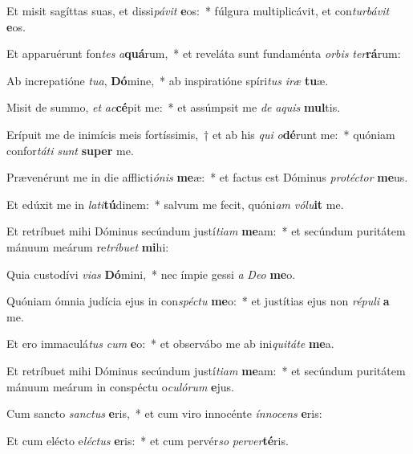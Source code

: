 \item Et misit sagíttas suas, et dissi\textit{pá}\textit{vit} \textbf{e}os:~* fúlgura multiplicávit, et con\textit{tur}\textit{bá}\textit{vit} \textbf{e}os.
\item Et apparuérunt fon\textit{tes} \textit{a}\textbf{quá}rum,~* et reveláta sunt fundaménta \textit{or}\textit{bis} \textit{ter}\textbf{rá}rum:
\item Ab increpatióne \textit{tu}\textit{a}, \textbf{Dó}mine,~* ab inspiratióne spíri\textit{tus} \textit{i}\textit{ræ} \textbf{tu}æ.
\item Misit de summo, \textit{et} \textit{ac}\textbf{cé}pit me:~* et assúmpsit me \textit{de} \textit{a}\textit{quis} \textbf{mul}tis.
\item Erípuit me de inimícis meis fortíssimis,~† et ab his \textit{qui} \textit{o}\textbf{dé}runt me:~* quóniam confor\textit{tá}\textit{ti} \textit{sunt} \textbf{su}\textbf{per} me.
\item Prævenérunt me in die afflicti\textit{ó}\textit{nis} \textbf{me}æ:~* et factus est Dóminus \textit{pro}\textit{téc}\textit{tor} \textbf{me}us.
\item Et edúxit me in \textit{la}\textit{ti}\textbf{tú}dinem:~* salvum me fecit, quóni\textit{am} \textit{vó}\textit{lu}\textbf{it} me.
\item Et retríbuet mihi Dóminus secúndum justí\textit{ti}\textit{am} \textbf{me}am:~* et secúndum puritátem mánuum meárum re\textit{trí}\textit{bu}\textit{et} \textbf{mi}hi:
\item Quia custodívi \textit{vi}\textit{as} \textbf{Dó}mini,~* nec ímpie gessi \textit{a} \textit{De}\textit{o} \textbf{me}o.
\item Quóniam ómnia judícia ejus in con\textit{spéc}\textit{tu} \textbf{me}o:~* et justítias ejus non \textit{ré}\textit{pu}\textit{li} \textbf{a} me.
\item Et ero immaculá\textit{tus} \textit{cum} \textbf{e}o:~* et observábo me ab ini\textit{qui}\textit{tá}\textit{te} \textbf{me}a.
\item Et retríbuet mihi Dóminus secúndum justí\textit{ti}\textit{am} \textbf{me}am:~* et secúndum puritátem mánuum meárum in conspéctu o\textit{cu}\textit{ló}\textit{rum} \textbf{e}jus.
\item Cum sancto \textit{sanc}\textit{tus} \textbf{e}ris,~* et cum viro innocénte \textit{ín}\textit{no}\textit{cens} \textbf{e}ris:
\item Et cum elécto e\textit{léc}\textit{tus} \textbf{e}ris:~* et cum pervér\textit{so} \textit{per}\textit{ver}\textbf{té}ris.
